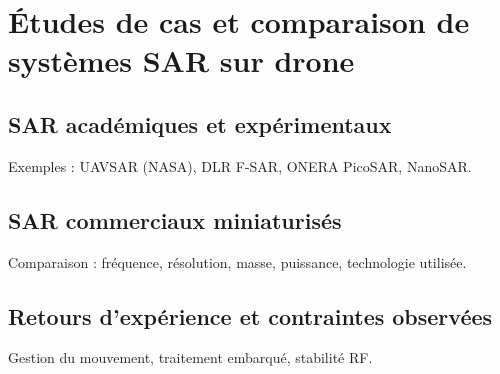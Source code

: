 \section{Études de cas et comparaison de systèmes SAR sur drone}\label{SEC:Études de cas et comparaison de systèmes SAR sur drone}

\subsection{SAR académiques et expérimentaux}

Exemples : UAVSAR (NASA), DLR F-SAR, ONERA PicoSAR, NanoSAR.


\subsection{SAR commerciaux miniaturisés}

Comparaison : fréquence, résolution, masse, puissance, technologie utilisée.


\subsection{Retours d’expérience et contraintes observées}

Gestion du mouvement, traitement embarqué, stabilité RF.
